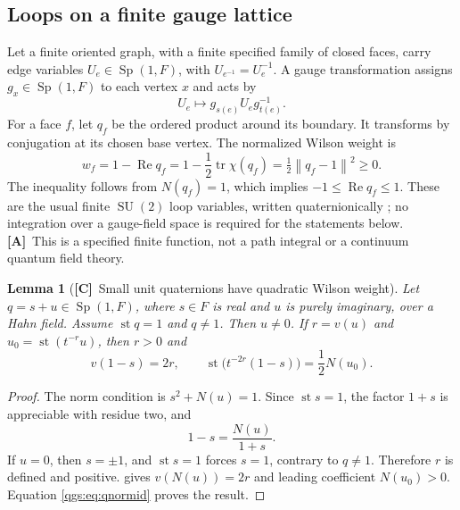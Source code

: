 \documentclass[11pt,oneside]{article}
\numberwithin{equation}{section}
\theoremstyle{plain}
\newtheorem{lemma}[lemma]{Lemma}
\theoremstyle{definition}
\theoremstyle{remark}
\DeclareMathOperator{\st}{st}
\DeclareMathOperator{\tr}{tr}
\DeclareMathOperator{\Rea}{Re}
\DeclareMathOperator{\SU}{SU}
\DeclareMathOperator{\Sp}{Sp}
\newcommand{\norm}[1]{\left\|#1\right\|}
\newcommand{\TC}{\textcolor{TierC}{\textsf{\bfseries[C]}}}
\newcommand{\TA}{\textcolor{TierA}{\textsf{\bfseries[A]}}}
\begin{document}
\subsection{Loops on a finite gauge lattice}
Let a finite oriented graph, with a finite specified family of closed faces, carry edge variables $U_e\in\Sp(1,F)$, with $U_{e^{-1}}=U_e^{-1}$. A gauge transformation assigns $g_x\in\Sp(1,F)$ to each vertex $x$ and acts by
\[
 U_e\longmapsto g_{s(e)}U_e g_{t(e)}^{-1}.
\]
For a face $f$, let $q_f$ be the ordered product around its boundary. It transforms by conjugation at its chosen base vertex. The normalized Wilson weight is
\begin{equation}\label{qgs:eq:WilsonWeight}
 w_f=1-\Rea q_f
 =1-\frac12\tr\chi(q_f)=\tfrac12\norm{q_f-1}^2\ge0.
\end{equation}
The inequality follows from $N(q_f)=1$, which implies $-1\le\Rea q_f\le1$. These are the usual finite $\SU(2)$ loop variables, written quaternionically \cite{Wilson}; no integration over a gauge-field space is required for the statements below. \TA\ This is a specified finite function, not a path integral or a continuum quantum field theory.

\begin{lemma}[\TC\ Small unit quaternions have quadratic Wilson weight]\label{qgs:lem:smallq}
Let $q=s+u\in\Sp(1,F)$, where $s\in F$ is real and $u$ is purely imaginary, over a Hahn field. Assume $\st q=1$ and $q\ne1$. Then $u\ne0$. If $r=v(u)$ and $u_0=\st(t^{-r}u)$, then $r>0$ and
\begin{equation}\label{qgs:eq:smallq}
 v(1-s)=2r,\qquad
 \st\bigl(t^{-2r}(1-s)\bigr)=\frac12 N(u_0).
\end{equation}
\end{lemma}
\begin{proof}
The norm condition is $s^2+N(u)=1$. Since $\st s=1$, the factor $1+s$ is appreciable with residue two, and
\begin{equation}\label{qgs:eq:qnormid}
 1-s=\frac{N(u)}{1+s}.
\end{equation}
If $u=0$, then $s=\pm1$, and $\st s=1$ forces $s=1$, contrary to $q\ne1$. Therefore $r$ is defined and positive.  gives $v(N(u))=2r$ and leading coefficient $N(u_0)>0$. Equation \eqref{qgs:eq:qnormid} proves the result.
\end{proof}
\end{document}
